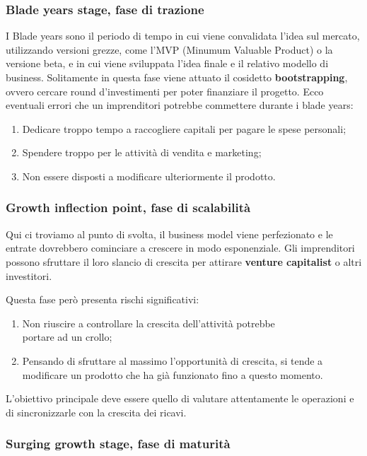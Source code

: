 \documentclass[14pt]{extarticle}
\begin{document}
\subsubsection{Blade years stage, fase di trazione}

I Blade years sono il periodo di tempo in cui viene convalidata l'idea sul
mercato, utilizzando versioni grezze, come l'MVP (Minumum Valuable Product) o la
versione beta, e in cui viene sviluppata l'idea finale e il relativo modello di
business. Solitamente in questa fase viene attuato il cosidetto
\textbf{bootstrapping}, ovvero cercare round d'investimenti per poter finanziare
il progetto. Ecco eventuali errori che un imprenditori potrebbe commettere
durante i blade years:

\begin{enumerate}
    \item Dedicare troppo tempo a raccogliere capitali per pagare le spese
    personali;
    \item Spendere troppo per le attività di vendita e marketing;
    \item Non essere disposti a modificare ulteriormente il prodotto.  
\end{enumerate}

\subsubsection{Growth inflection point, fase di scalabilità}

Qui ci troviamo al punto di svolta, il business model viene perfezionato e le
entrate dovrebbero cominciare a crescere in modo esponenziale. Gli imprenditori
possono sfruttare il loro slancio di crescita per attirare \textbf{venture
capitalist} o altri investitori.

Questa fase però presenta rischi significativi:

\begin{enumerate}
    \item Non riuscire a controllare la crescita dell'attività potrebbe \\
    portare ad un crollo;
    \item Pensando di sfruttare al massimo l'opportunità di crescita, si tende a
    modificare un prodotto che ha già funzionato fino a questo momento. 
\end{enumerate}
L'obiettivo principale deve essere quello di valutare attentamente le operazioni
e di sincronizzarle con la crescita dei ricavi.

\subsubsection{Surging growth stage, fase di maturità}
\end{document}
